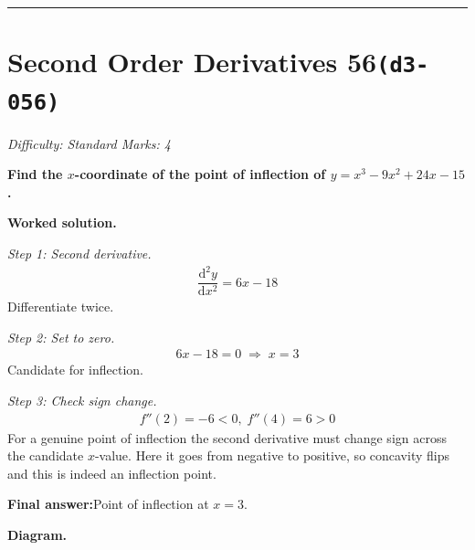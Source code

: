 \documentclass[11pt]{article}
\newcommand{\question}[1]{\par\medskip\noindent\textbf{#1}\par}
\begin{document}
\medskip\hrule

\section*{Second Order Derivatives 56\quad\small\texttt{(d3-056)}}
\textit{Difficulty: Standard \quad\textbar\quad Marks: 4}

\question{Find the \( x \)-coordinate of the point of inflection of \( y = x^3 - 9x^2 + 24x - 15 \).}

\textbf{Worked solution.}

\textit{Step 1: Second derivative.}
\[\begin{gathered}
\dfrac{\mathrm{d}^2y}{\mathrm{d}x^2} = 6x - 18
\end{gathered}\]
Differentiate twice.

\textit{Step 2: Set to zero.}
\[\begin{gathered}
6x - 18 = 0 \;\Rightarrow\; x = 3
\end{gathered}\]
Candidate for inflection.

\textit{Step 3: Check sign change.}
\[\begin{gathered}
f''(2) = -6 < 0, \; f''(4) = 6 > 0
\end{gathered}\]
For a genuine point of inflection the second derivative must change sign across the candidate \(x\)-value. Here it goes from negative to positive, so concavity flips and this is indeed an inflection point.

\begin{answerbox}
\textbf{Final answer:}\quad Point of inflection at \(\displaystyle  x = 3 \).
\end{answerbox}
\textbf{Diagram.}
\end{document}
